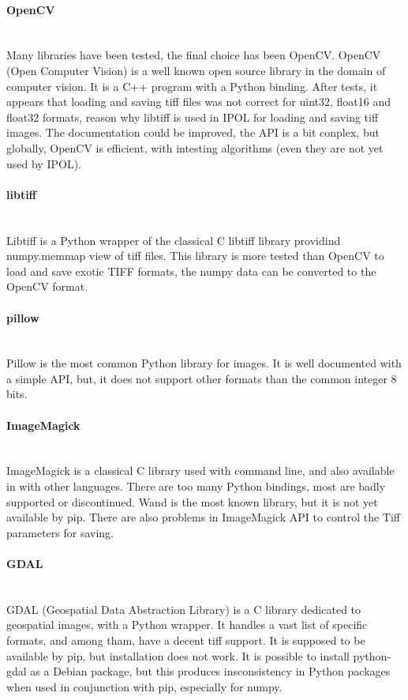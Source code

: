 \paragraph{OpenCV} \hspace{0pt} \\
Many libraries have been tested, the final choice has been OpenCV. OpenCV (Open Computer Vision) is a well known open source library in the domain of computer vision. It is a C++ program with a Python binding. After tests, it appears that loading and saving tiff files was not correct for uint32, float16 and float32 formats, reason why libtiff is used in IPOL for loading and saving tiff images. The documentation could be improved, the API is a bit conplex, but globally, OpenCV is efficient, with intesting algorithms (even they are not yet used by IPOL).

\paragraph{libtiff} \hspace{0pt} \\
Libtiff is a Python wrapper of the classical C libtiff library providind numpy.memmap view of tiff files. This library is more tested than OpenCV to load and save exotic TIFF formats, the numpy data can be converted to the OpenCV format.

\paragraph{pillow} \hspace{0pt} \\
Pillow is the most common Python library for images. It is well documented with a simple API, but, it does not support other formats than the common integer 8 bits.

\paragraph{ImageMagick} \hspace{0pt} \\
ImageMagick is a classical C library used with command line, and also available in with other languages. There are too many Python bindings, most are badly supported or discontinued. Wand is the most known library, but it is not yet available by pip. There are also problems in ImageMagick API to control the Tiff parameters for saving.

\paragraph{GDAL} \hspace{0pt} \\
GDAL (Geospatial Data Abstraction Library) is a C library dedicated to geospatial images, with a Python wrapper. It handles a vast list of specific formats, and among tham, have a decent tiff support. It is supposed to be available by pip, but installation does not work. It is possible to install python-gdal as a Debian package, but this produces insconsistency in Python packages when used in conjunction with pip, especially for numpy.

